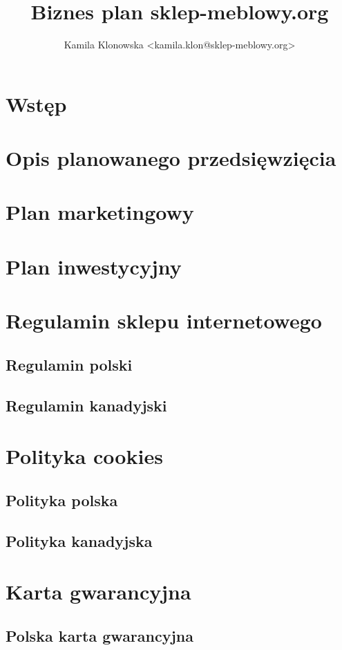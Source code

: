 \documentclass[
12pt, %
a4paper
]{report}
\title{Biznes plan sklep-meblowy.org}
\author{Kamila Klonowska <kamila.klon@sklep-meblowy.org>}
\begin{document}




\chapter*{Wstęp}


\chapter{Opis planowanego przedsięwzięcia}


\chapter{Plan marketingowy}


\chapter{Plan inwestycyjny}



\appendix

\chapter{Regulamin sklepu internetowego}
	\section{Regulamin polski}
		
		
	\section{Regulamin kanadyjski}
		

\chapter{Polityka cookies}
	 \section{Polityka polska}
                
    
        \section{Polityka kanadyjska}
                

\chapter{Karta gwarancyjna}
	\section{Polska karta gwarancyjna}
		
	
\end{document}
